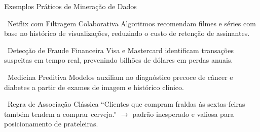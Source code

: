 \documentclass[aspectratio=169]{beamer}
\begin{document}
\begin{frame}{Exemplos Práticos de Mineração de Dados}
    \footnotesize
    \begin{block}{\faFilm\ Netflix com Filtragem Colaborativa}
        Algoritmos recomendam filmes e séries com base no histórico de visualizações, reduzindo o custo de retenção de assinantes.
    \end{block}
    \vspace{0.15cm}
    \begin{block}{\faCreditCard\ Detecção de Fraude Financeira}
        Visa e Mastercard identificam transações suspeitas em tempo real, prevenindo bilhões de dólares em perdas anuais.
    \end{block}
    \vspace{0.15cm}
    \begin{block}{\faHeartbeat\ Medicina Preditiva}
        Modelos auxiliam no diagnóstico precoce de câncer e diabetes a partir de exames de imagem e histórico clínico.
    \end{block}
    \vspace{0.15cm}
    \begin{alertblock}{\faShoppingCart\ Regra de Associação Clássica}
        ``Clientes que compram fraldas às sextas-feiras também tendem a comprar cerveja.'' $\rightarrow$ padrão inesperado e valiosa para posicionamento de prateleiras.
    \end{alertblock}
\end{frame}
\end{document}
